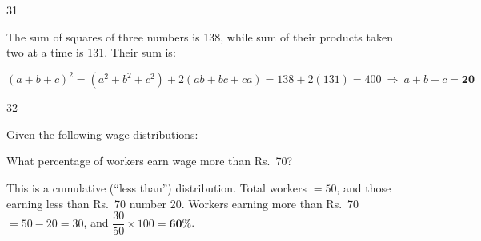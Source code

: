 \begin{question}{31}
{The sum of squares of three numbers is 138, while sum of their products taken two at a time is 131. Their sum is:\par}
\begin{explain}
\[(a+b+c)^2=(a^2+b^2+c^2)+2(ab+bc+ca)=138+2(131)=400\ \Rightarrow\ a+b+c=\mathbf{20}\]
\end{explain}
\end{question}

\begin{question}{32}
{Given the following wage distributions:\par}
What percentage of workers earn wage more than Rs.~70?
\begin{explain}
This is a cumulative (``less than'') distribution. Total workers $=50$, and those earning less than Rs.~70 number 20.
Workers earning more than Rs.~70 $=50-20=30$, and $\dfrac{30}{50}\times100=\mathbf{60\%}$.
\end{explain}
\end{question}

